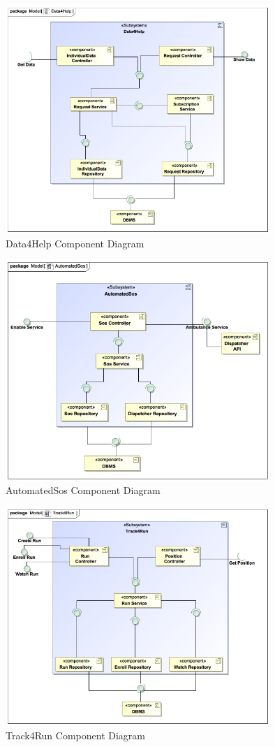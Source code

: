 \documentclass[a4paper]{article}
\begin{document}
\begin{figure}[!htpb]
    \centering
    \includegraphics[width=100mm,keepaspectratio]{DD/images/UML/component_Data4Help.jpg}
    \caption{Data4Help Component Diagram}
    \label{fig:component_data4help}
\end{figure}
\begin{figure}[!htpb]
    \centering
    \includegraphics[width=100mm,keepaspectratio]{DD/images/UML/component_AutomatedSos.jpg}
    \caption{AutomatedSos Component Diagram}
    \label{fig:component_automatedsos}
\end{figure}
\begin{figure}[!htpb]
    \centering
    \includegraphics[width=100mm,keepaspectratio]{DD/images/UML/component_Track4Run.jpg}
    \caption{Track4Run Component Diagram}
    \label{fig:component_track4run}
\end{figure}
\end{document}
